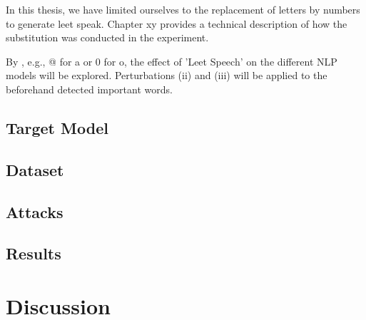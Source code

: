 In this thesis, we have limited ourselves to the replacement of letters by numbers to generate leet speak. Chapter xy provides a technical description of how the substitution was conducted in the experiment.

By , e.g., @ for a or 0 for o, the effect of 'Leet Speech' on the different NLP models will be explored.
Perturbations (ii) and (iii) will be applied to the beforehand detected important words.






\subsection{Target Model} 


\subsection{Dataset} 



\subsection{Attacks}




\subsection{Results}


\section{Discussion}


